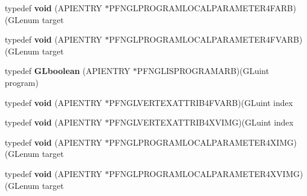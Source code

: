 \begin{DoxyCompactItemize}
\item 
\hypertarget{class_c_p_v_r_tgles_ext_a9d31a4fbc52adc6a41c05cb9c20e08d2}{typedef {\bfseries void} (A\+P\+I\+E\+N\+T\+R\+Y $\ast$P\+F\+N\+G\+L\+P\+R\+O\+G\+R\+A\+M\+L\+O\+C\+A\+L\+P\+A\+R\+A\+M\+E\+T\+E\+R4\+F\+A\+R\+B)(G\+Lenum target}\label{class_c_p_v_r_tgles_ext_a9d31a4fbc52adc6a41c05cb9c20e08d2}

\item 
\hypertarget{class_c_p_v_r_tgles_ext_a6fb44bf218e5f8a6776c032b19f5396e}{typedef {\bfseries void} (A\+P\+I\+E\+N\+T\+R\+Y $\ast$P\+F\+N\+G\+L\+P\+R\+O\+G\+R\+A\+M\+L\+O\+C\+A\+L\+P\+A\+R\+A\+M\+E\+T\+E\+R4\+F\+V\+A\+R\+B)(G\+Lenum target}\label{class_c_p_v_r_tgles_ext_a6fb44bf218e5f8a6776c032b19f5396e}

\item 
\hypertarget{class_c_p_v_r_tgles_ext_a13dca5f8dd8aa660549b675ec1c2a814}{typedef {\bfseries G\+Lboolean} (A\+P\+I\+E\+N\+T\+R\+Y $\ast$P\+F\+N\+G\+L\+I\+S\+P\+R\+O\+G\+R\+A\+M\+A\+R\+B)(G\+Luint program)}\label{class_c_p_v_r_tgles_ext_a13dca5f8dd8aa660549b675ec1c2a814}

\item 
\hypertarget{class_c_p_v_r_tgles_ext_a5f5a08c3e7af1cc781677a5a3c21c792}{typedef {\bfseries void} (A\+P\+I\+E\+N\+T\+R\+Y $\ast$P\+F\+N\+G\+L\+V\+E\+R\+T\+E\+X\+A\+T\+T\+R\+I\+B4\+F\+V\+A\+R\+B)(G\+Luint index}\label{class_c_p_v_r_tgles_ext_a5f5a08c3e7af1cc781677a5a3c21c792}

\item 
\hypertarget{class_c_p_v_r_tgles_ext_a8c9d761ee57d9343877ee55b237247c2}{typedef {\bfseries void} (A\+P\+I\+E\+N\+T\+R\+Y $\ast$P\+F\+N\+G\+L\+V\+E\+R\+T\+E\+X\+A\+T\+T\+R\+I\+B4\+X\+V\+I\+M\+G)(G\+Luint index}\label{class_c_p_v_r_tgles_ext_a8c9d761ee57d9343877ee55b237247c2}

\item 
\hypertarget{class_c_p_v_r_tgles_ext_a943292d6757d36762102acddc8d9b28f}{typedef {\bfseries void} (A\+P\+I\+E\+N\+T\+R\+Y $\ast$P\+F\+N\+G\+L\+P\+R\+O\+G\+R\+A\+M\+L\+O\+C\+A\+L\+P\+A\+R\+A\+M\+E\+T\+E\+R4\+X\+I\+M\+G)(G\+Lenum target}\label{class_c_p_v_r_tgles_ext_a943292d6757d36762102acddc8d9b28f}

\item 
\hypertarget{class_c_p_v_r_tgles_ext_af67820336bdf4918c3d96ff9ab4448ba}{typedef {\bfseries void} (A\+P\+I\+E\+N\+T\+R\+Y $\ast$P\+F\+N\+G\+L\+P\+R\+O\+G\+R\+A\+M\+L\+O\+C\+A\+L\+P\+A\+R\+A\+M\+E\+T\+E\+R4\+X\+V\+I\+M\+G)(G\+Lenum target}\label{class_c_p_v_r_tgles_ext_af67820336bdf4918c3d96ff9ab4448ba}


\end{DoxyCompactItemize}
